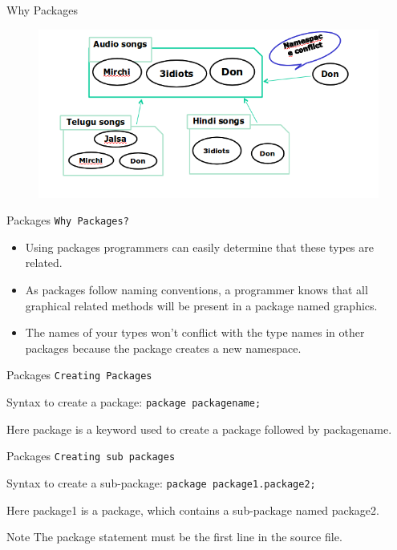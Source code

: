 \documentclass[14pt]{beamer}
\begin{document}
\begin{frame}{Why Packages}
\begin{figure}[H]
 \begin{center}
   \includegraphics[scale=.4]{why-packages.png}
 \end{center}
 \end{figure}
\end{frame}

\begin{frame}{Packages}
\texttt{Why Packages?}
\begin{itemize}
 \item Using packages programmers can easily determine that these types are related.
 \item As packages follow naming conventions, a programmer knows that all graphical related methods will be present in a package named graphics.
 \item The names of your types won't conflict with the type names in other packages because the package creates a new namespace.
\end{itemize}


\end{frame}

\begin{frame}[fragile]{Packages}
\texttt{Creating Packages}
\begin{block}{Syntax to create a package:}
\lstinline!package packagename;!
\end{block}
Here package is a keyword used to create a package followed by packagename.
\end{frame}
\begin{frame}{Packages}
\texttt{Creating sub packages}
\begin{block}{Syntax to create a sub-package:}
\lstinline!package package1.package2;!
\end{block}
Here package1 is a package, which contains a sub-package named package2.
\begin{block}{Note}
The package statement must be the first line in the source file.
\end{block}
\end{frame}
\end{document}
